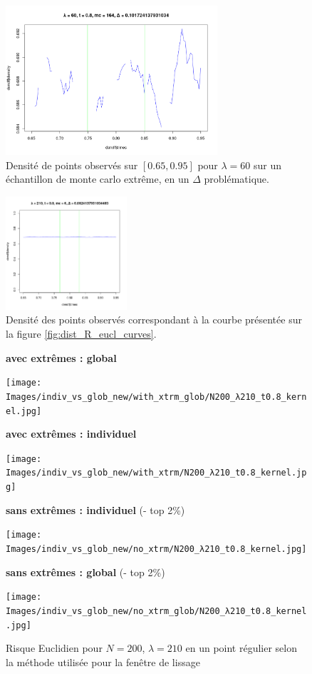 \begin{figure}[H]
	\centering
	\includegraphics[width=0.7\textwidth]{Images/indiv_vs_glob/Tdensity_lbd60_mc164.png}
	\caption{Densité de points observés sur $[0.65, 0.95]$ pour $\lambda = 60$ sur un échantillon de monte carlo extrême, en un $\Delta$ problématique.}
	\label{fig:den_ex}
\end{figure}


\begin{figure}[H]
	\centering
	\includegraphics[width=0.4\textwidth]{Images/indiv_vs_glob/worst_210_67_mc6.png}
	\caption{Densité des points observés correspondant à la courbe présentée sur la figure \ref{fig:dist_R_eucl_curves}.}
	\label{fig:den_counterex}
\end{figure}







\begin{figure}[H]
	\centering

	\textbf{avec extrêmes : global}

	\texttt{[image: Images/indiv\_vs\_glob\_new/with\_xtrm\_glob/N200\_λ210\_t0.8\_kernel.jpg]}

	\textbf{avec extrêmes : individuel}

	\texttt{[image: Images/indiv\_vs\_glob\_new/with\_xtrm/N200\_λ210\_t0.8\_kernel.jpg]}

	\textbf{sans extrêmes : individuel} (- top 2\%)

	\texttt{[image: Images/indiv\_vs\_glob\_new/no\_xtrm/N200\_λ210\_t0.8\_kernel.jpg]}

	\textbf{sans extrêmes : global} (- top 2\%)

	\texttt{[image: Images/indiv\_vs\_glob\_new/no\_xtrm\_glob/N200\_λ210\_t0.8\_kernel.jpg]}
	\caption{Risque Euclidien pour $N=200$, $\lambda=210$ en un point régulier selon la méthode utilisée pour la fenêtre de lissage}
	\label{fig:compare_xtrm}
\end{figure}